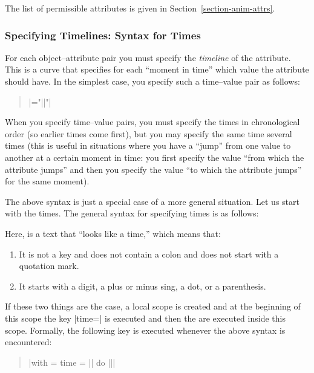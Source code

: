 The list of permissible attributes is given in
Section~\ref{section-anim-attrs}. 

    
\subsubsection{Specifying Timelines: Syntax for Times}

\label{section-anim-timeline}

For each object--attribute pair you must specify the \emph{timeline}
of the attribute. This is a curve that specifies for each ``moment in
time'' which value the attribute should have. In the simplest case,
you specify such a time--value pair as follows:
\begin{quote}
  \normalfont
   |="||"|    
\end{quote}

When you specify time--value pairs, you must specify the times in
chronological order (so earlier times come first), but you may specify
the same time several times (this is useful in situations where you
have a ``jump'' from one value to another at a certain moment in
time: you first specify the value ``from which the attribute jumps''
and then you specify the value ``to which the attribute jumps'' for
the same moment).  

The above syntax is just a special case of a more general
situation. Let us start with the times. The general syntax for
specifying times is as follows:

\begin{quote}
  \normalfont
   
\end{quote}

Here,  is a text that ``looks like a time,'' which means
that:
\begin{enumerate}
\item It is not a key and does not contain a colon and does not start
  with a quotation mark.
\item It starts with a digit, a plus or minus sing, a dot, or a
  parenthesis. 
\end{enumerate}

If these two things are the case, a local scope is created and at the
beginning of this scope the key |time=| is executed and
then the  are executed inside this scope. Formally, the
following key is executed whenever the above syntax is encountered:
\begin{quote}
  \normalfont
  |with = {time = ||} do {||}|
\end{quote}

